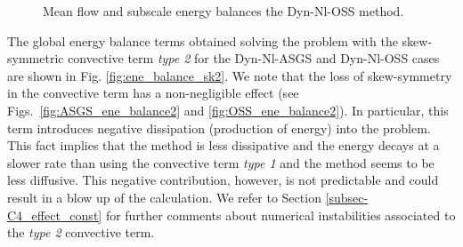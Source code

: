 \begin{figure}[h!]
  \centering
  \caption{Mean flow and subscale energy balances the Dyn-Nl-OSS method.}
  \label{fig:OSS_ene_balance_split}
\end{figure}

The global energy balance terms obtained solving the problem with the skew-symmetric convective term \textit{type 2} for the Dyn-Nl-ASGS and Dyn-Nl-OSS cases are shown in Fig. \ref{fig:ene_balance_sk2}. We note that the loss of skew-symmetry in the convective term has a non-negligible effect (see Figs.~\ref{fig:ASGS_ene_balance2} and \ref{fig:OSS_ene_balance2}). In particular, this term introduces negative dissipation (production of energy) into the problem. %
This fact implies that the method is less dissipative and the energy decays at a slower rate than using the convective term \textit{type 1} and the method seems to be less diffusive. This negative contribution, however, is not predictable and could result in a blow up of the calculation. We refer to Section \ref{subsec-C4_effect_const} for further comments about numerical instabilities associated to the \textit{type 2} convective term.%

